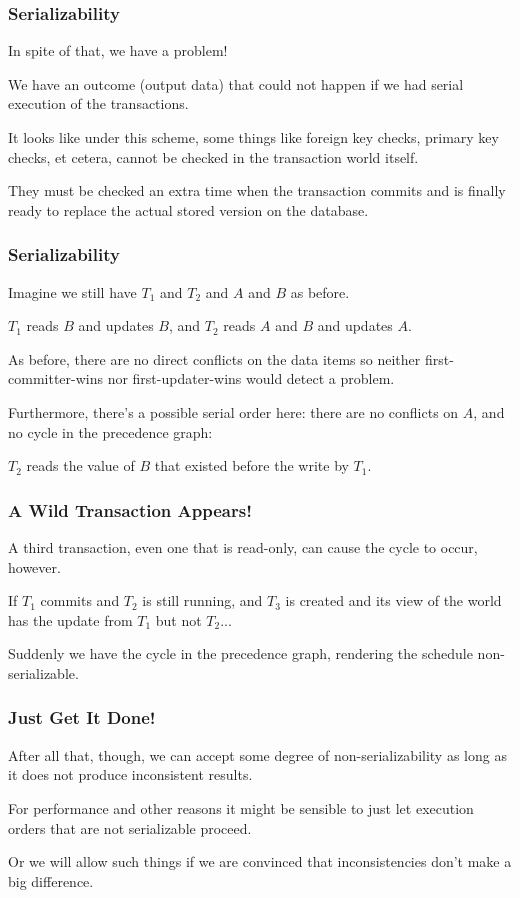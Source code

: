 \begin{frame}
\frametitle{Serializability}
In spite of that, we have a problem! 

We have an outcome (output data) that could not happen if we had serial execution of the transactions.

It looks like under this scheme, some things like foreign key checks, primary key checks, et cetera, cannot be checked in the transaction world itself.

They must be checked an extra time when the transaction commits and is finally ready to replace the actual stored version on the database.

\end{frame}

\begin{frame}
\frametitle{Serializability}
Imagine we still have $T_{1}$ and $T_{2}$ and $A$ and $B$ as before. 

$T_{1}$ reads $B$ and updates $B$, and $T_{2}$ reads $A$ and $B$ and updates $A$. 

As before, there are no direct conflicts on the data items so neither first-committer-wins nor first-updater-wins would detect a problem. 

Furthermore, there's a possible serial order here: there are no conflicts on $A$, and no cycle in the precedence graph: 

$T_{2}$ reads the value of $B$ that existed before the write by $T_{1}$.


\end{frame}

\begin{frame}
\frametitle{A Wild Transaction Appears!}

A third transaction, even one that is read-only, can cause the cycle to occur, however. 

If $T_{1}$ commits and $T_{2}$ is still running, and $T_{3}$ is created and its view of the world has the update from $T_{1}$ but not $T_{2}$...

Suddenly we have the cycle in the precedence graph, rendering the schedule non-serializable.


\end{frame}

\begin{frame}
\frametitle{Just Get It Done!}

After all that, though, we can accept some degree of non-serializability as long as it does not produce inconsistent results. 

For performance and other reasons it might be sensible to just let execution orders that are not serializable proceed.  

Or we will allow such things if we are convinced that inconsistencies don't make a big difference. 


\end{frame}

